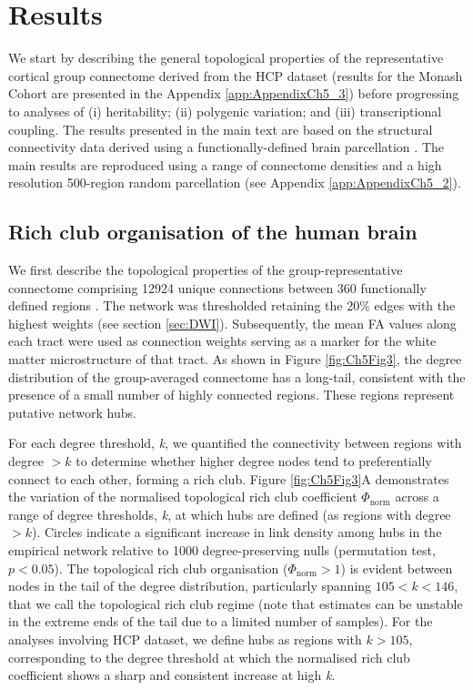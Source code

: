 \section{Results}

We start by describing the general topological properties of the representative cortical group connectome derived from the HCP dataset (results for the Monash Cohort are presented in the Appendix \ref{app:AppendixCh5_3}) before progressing to analyses of (i) heritability; (ii) polygenic variation; and (iii) transcriptional coupling. The results presented in the main text are based on the structural connectivity data derived using a functionally-defined brain parcellation \citep{Glasser2016}. The main results are reproduced using a range of connectome densities and a high resolution 500-region random parcellation (see Appendix \ref{app:AppendixCh5_2}).

\subsection{Rich club organisation of the human brain}

We first describe the topological properties of the group-representative connectome comprising \num{12924} unique connections between 360 functionally defined regions \citep{Glasser2016}. The network was thresholded retaining the 20\% edges with the highest weights (see section \ref{sec:DWI}). Subsequently, the mean FA values along each tract were used as connection weights serving as a marker for the white matter microstructure of that tract. As shown in Figure \ref{fig:Ch5Fig3}, the degree distribution of the group-averaged connectome has a long-tail, consistent with the presence of a small number of highly connected regions. These regions represent putative network hubs.

For each degree threshold, \textit{k}, we quantified the connectivity between regions with degree $> k$ to determine whether higher degree nodes tend to preferentially connect to each other, forming a rich club. Figure \ref{fig:Ch5Fig3}A demonstrates the variation of the normalised topological rich club coefficient $\Phi_\mathrm{norm}$ across a range of degree thresholds, \textit{k}, at which hubs are defined (as regions with degree $> k$). Circles indicate a significant increase in link density among hubs in the empirical network relative to 1000 degree-preserving nulls (permutation test, $p < 0.05$). The topological rich club organisation ($\Phi_\mathrm{norm} >1$) is evident between nodes in the tail of the degree distribution, particularly spanning $105< k <146$, that we call the topological rich club regime (note that estimates can be unstable in the extreme ends of the tail due to a limited number of samples). For the analyses involving HCP dataset, we define hubs as regions with $k > 105$, corresponding to the degree threshold at which the normalised rich club coefficient shows a sharp and consistent increase at high \textit{k}.

